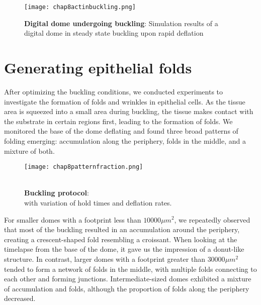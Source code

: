 \begin{figure}
	\centering
	\texttt{[image: chap8actinbuckling.png]}
	\caption{\label{fig_8_6} \textbf{Digital dome undergoing buckling}: Simulation results of a digital dome in steady state buckling upon rapid deflation
	}
\end{figure}

\hypertarget{generating-epithelial-folds}{%
	\section{Generating epithelial
		folds}\label{generating-epithelial-folds}}

After optimizing the buckling conditions, we conducted experiments to
investigate the formation of folds and wrinkles in epithelial cells. As
the tissue area is squeezed into a small area during buckling, the
tissue makes contact with the substrate in certain regions first,
leading to the formation of folds. We monitored the base of the dome
deflating and found three broad patterns of folding emerging:
accumulation along the periphery, folds in the middle, and a mixture of
both.

\begin{figure}
	\begin{minipage}[c]{0.5\textwidth}
		\texttt{[image: chap8patternfraction.png]}
	\end{minipage}\hfill
	\begin{minipage}[c]{0.45\textwidth}
		\caption{\\ \textbf{Buckling protocol}:\\ with variation of hold times and deflation rates.
		} \label{fig_8_8}
	\end{minipage}
\end{figure}

For smaller domes with a footprint less than \(10000 \mu m^2\), we
repeatedly observed that most of the buckling resulted in an
accumulation around the periphery, creating a crescent-shaped fold
resembling a croissant. When looking at the timelapse from the base of
the dome, it gave us the impression of a donut-like structure. In
contrast, larger domes with a footprint greater than \(30000\mu m^2\)
tended to form a network of folds in the middle, with multiple folds
connecting to each other and forming junctions. Intermediate-sized domes
exhibited a mixture of accumulation and folds, although the proportion
of folds along the periphery decreased.

